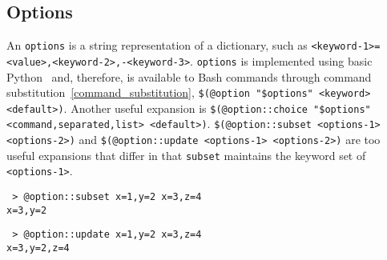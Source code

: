 \subsection{Options}
\label{options}

An \texttt{options} is a string representation of a dictionary, such as \texttt{<keyword-1>=<value>,<keyword-2>,-<keyword-3>}. \texttt{options} is implemented using basic Python~ and, therefore, is available to Bash commands through command substitution~\ref{command_substitution}, \texttt{\$(@option "\$options" <keyword> <default>)}. Another useful expansion is
\texttt{\$(@option::choice "\$options" <command,separated,list> <default>)}. \texttt{\$(@option::subset <options-1> <options-2>)} and \texttt{\$(@option::update <options-1> <options-2>)} are too useful expansions that differ in that \texttt{subset} maintains the keyword set of \texttt{<options-1>}.
%
\begin{verbatim}
 > @option::subset x=1,y=2 x=3,z=4
x=3,y=2
\end{verbatim}
%
\begin{verbatim}
 > @option::update x=1,y=2 x=3,z=4
x=3,y=2,z=4
\end{verbatim}